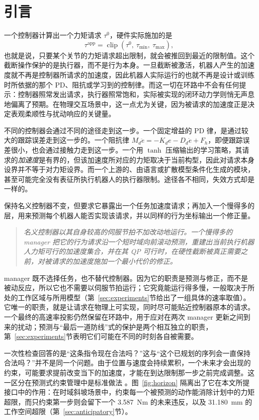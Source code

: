 \documentclass[journal]{IEEEtran}
\begin{document}
\section{引言}
\label{sec:intro}

一个控制器计算出一个力矩请求 $\tau^0$，硬件实际施加的是
\[
\tau^{\mathrm{app}}
=
\operatorname{clip}\left(\tau^0,\ \tau_{\min},\ \tau_{\max}\right),
\]
也就是说，只要某个关节的力矩请求超出限制，就会被推回到最近的限制值。这个截断操作保护的是执行器，而不是行为本身。一旦截断被激活，机器人产生的加速度就不再是控制器所请求的加速度，因此机器人实际运行的也就不再是设计或训练时所依据的那个 PD、阻抗或学习到的控制律。而这一切在环路中不会有任何提示：控制器照常发出请求，执行器照常饱和，实际被实现的闭环动力学则悄无声息地偏离了预期。在物理交互场景中，这一点尤为关键，因为被请求的加速度正是决定表观柔顺性与扰动响应的关键量。

不同的控制器会通过不同的途径走到这一步。一个固定增益的 PD 律，是通过较大的跟踪误差走到这一步的。一个阻抗律 $M_d\ddot e=-K_de-D_d\dot e+F_h$，即便跟踪误差很小，也会通过接触力走到这一步。一个用 $\tanh$ 压缩输出的学习策略，其请求的\emph{加速度}是有界的，但该加速度所对应的力矩取决于当前构型，因此对请求本身设界并不等于对力矩设界。而一个上游的、由语言或扩散模型条件化生成的模块，甚至可能完全没有表征所执行机器人的执行器限制。途径各不相同，失效方式却是一样的。

保持名义控制器不变，但要求它暴露出一个任务加速度请求；再加入一个慢得多的层，用来预测每个机器人能否实现该请求，并以同样的行为坐标输出一个修正量。

\begin{quote}
\emph{名义控制器以其自身较高的伺服节拍不加改动地运行。一个慢得多的 manager 把它的行为请求沿一个短时域向前滚动预测，重建出当前执行机器人力矩可行的加速度集合，并在其 QP 可行时，在硬性截断被真正需要之前，对被请求的加速度施加一个最小代价的修正。}
\end{quote}

manager 既不选择任务，也不替代控制器。因为它的职责是预测与修正，而不是被动反应，所以它也不需要以伺服节拍运行；它究竟能运行得多慢，一般取决于所处的工作区域与所用模型（第~\ref{sec:experiments}节给出了一组具体的速率取值）。它唯一的职责，就是让请求在物理上可实现，同时尽可能贴近控制器原本的请求。一个最终的高速率投影仍然保留在环路中，用于应对在两次 manager 更新之间到来的扰动；预测与“最后一道防线”式的保护是两个相互独立的职责，第~\ref{sec:experiments}节表明它们可能在不同的时刻各自被需要。

一次性检查回答的是“这条指令现在合法吗？”这与“这个已规划的序列会一直保持合法吗？”并不是同一个问题。由于位置与速度会持续累积，一个未来才会出现的约束，可能要求提前改变当下的加速度，才能在到达限制那一步之前完成调整。这一区分在预测式约束管理中是标准做法 \cite{r3,r5,r16,r17,r18}。图~\ref{fig:horizon} 隔离出了它在本文所提接口中的作用：在时域斜坡场景中，约束每一个被预测的动作能消除计划中的力矩超限，而只约束第一步则会留下一个 3.587~Nm 的未来违反，以及 31.180~mm 的工作空间超限（第~\ref{sec:anticipatory}节）。
\end{document}
